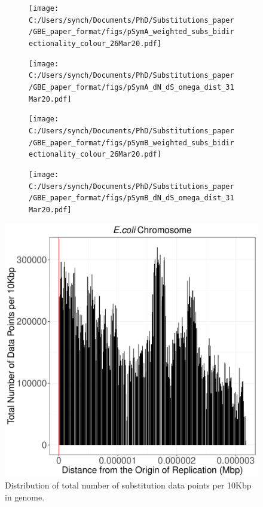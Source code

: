 \documentclass[12pt]{article}
\begin{document}
\begin{figure}
	\centering
	\begin{subfigure}{.5\textwidth}
		\centering
		\texttt{[image: C:/Users/synch/Documents/PhD/Substitutions\_paper/GBE\_paper\_format/figs/pSymA\_weighted\_subs\_bidirectionality\_colour\_26Mar20.pdf]}
		\caption{}
		\label{fig:sP1}
	\end{subfigure}%
	\begin{subfigure}{.5\textwidth}
		\centering
		\texttt{[image: C:/Users/synch/Documents/PhD/Substitutions\_paper/GBE\_paper\_format/figs/pSymA\_dN\_dS\_omega\_dist\_31Mar20.pdf]}
		\caption{}
		\label{fig:sP2}
	\end{subfigure}
	\label{fig:pSymA}
\end{figure}

\begin{figure}
	\centering
	\begin{subfigure}{.5\textwidth}
		\centering
		\texttt{[image: C:/Users/synch/Documents/PhD/Substitutions\_paper/GBE\_paper\_format/figs/pSymB\_weighted\_subs\_bidirectionality\_colour\_26Mar20.pdf]}
		\caption{}
		\label{fig:sB1}
	\end{subfigure}%
	\begin{subfigure}{.5\textwidth}
		\centering
		\texttt{[image: C:/Users/synch/Documents/PhD/Substitutions\_paper/GBE\_paper\_format/figs/pSymB\_dN\_dS\_omega\_dist\_31Mar20.pdf]}
		\caption{}
		\label{fig:sB2}
	\end{subfigure}
	\label{fig:pSymB}
\end{figure}

\begin{figure}
	\includegraphics[width=0.9\linewidth]{./ecoli_total_num_sites_graph.pdf}
	\caption{\label{fig:ecoli_tot_sites} Distribution of total number of  substitution  data points per 10Kbp in genome.}
\end{figure}
\end{document}
